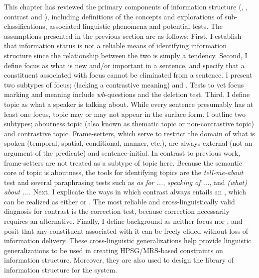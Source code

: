 This chapter has reviewed the primary components of information structure
(, , contrast and ), including definitions
of the concepts and explorations of sub-classifications, associated
linguistic phenomena and potential tests.  The assumptions presented
in the previous section are as follows: First, I establish that
information status is not a reliable means of identifying information
structure since the relationship between the two is simply a tendency.
Second, I define focus as what is new and/or important in a sentence,
and specify that a constituent associated with focus cannot be
eliminated from a sentence. I present two subtypes of focus; 
(lacking a contrastive meaning) and .
Tests to vet focus marking and
meaning include \textit{wh}-questions and the deletion
test. Third, I define topic as what a speaker is
talking about. While every sentence presumably has at least one focus,
topic may or may not appear in the surface form. I outline two
subtypes; aboutness topic (also known as thematic topic or non-contrastive
topic) and contrastive topic. Frame-setters, which serve to restrict
the domain of what is spoken (temporal, spatial, conditional, manner,
etc.), are always external (not an argument of the predicate) and
sentence-initial.  In contrast to previous work, frame-setters are not
treated as a subtype of topic here.  Because the semantic core of
topic is aboutness, the tools for identifying topics are the
\textit{tell-me-about} test and several paraphrasing tests such as
\textit{as for ...}, \textit{speaking of ...}, and \textit{(what)
  about ...}. Next, I explicate the
ways in which contrast always entails an , which
can be realized as either  or . The
most reliable and cross-linguistically valid diagnosis for contrast is
the correction test, because correction
necessarily requires an alternative. Finally, I define background as
neither focus nor , and posit that any constituent associated
with it can be freely elided without loss of information
delivery. These cross-linguistic generalizations help provide
linguistic generalizations to be used in creating HPSG/MRS-based
constraints on information structure. Moreover, they
are also used to design the library of information structure for the
\lingo {} system.



